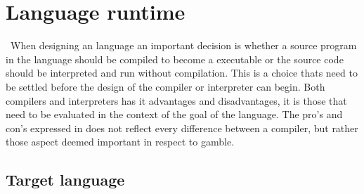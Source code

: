 \chapter{Language runtime}
\
When designing an language an important decision is whether a source program in the language should be compiled to become a executable or the source code should be interpreted and run without compilation.
This is a choice thats need to be settled before the design of the compiler or interpreter can begin.
Both compilers and interpreters has it advantages and disadvantages, it is those that need to be evaluated in the context of the goal of the language.
The pro's and con's expressed in \myref{tbl:compint} does not reflect every difference between a compiler, but rather those aspect deemed important in respect to \gls{gamble}.



\section{Target language}